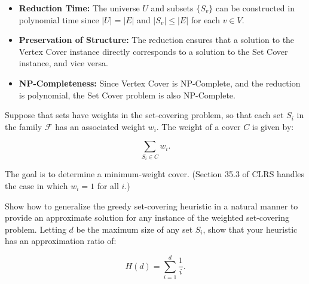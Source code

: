 \documentclass[10pt,letter,notitlepage]{article}
\newcounter{exercise}
\begin{document}
\begin{Answer}
\begin{itemize}
    \item \textbf{Reduction Time:} The universe \(U\) and subsets \(\{S_v\}\) can be constructed in polynomial time since \(|U| = |E|\) and \(|S_v| \leq |E|\) for each \(v \in V\).
    \item \textbf{Preservation of Structure:} The reduction ensures that a solution to the Vertex Cover instance directly corresponds to a solution to the Set Cover instance, and vice versa.
    \item \textbf{NP-Completeness:} Since Vertex Cover is NP-Complete, and the reduction is polynomial, the Set Cover problem is also NP-Complete.
\end{itemize}


\end{Answer}


\begin{exercise}[(20 marks)]

Suppose that sets have weights in the set-covering problem, so that each set \(S_i\) in the family \(\mathcal{F}\) has an associated weight \(w_i\). The weight of a cover \(C\) is given by:

\[
\sum_{S_i \in C} w_i.
\]

The goal is to determine a minimum-weight cover. (Section 35.3 of CLRS handles the case in which \(w_i = 1\) for all \(i\).)

Show how to generalize the greedy set-covering heuristic in a natural manner to provide an approximate solution for any instance of the weighted set-covering problem. Letting \(d\) be the maximum size of any set \(S_i\), show that your heuristic has an approximation ratio of:

\[
H(d) = \sum_{i=1}^d \frac{1}{i}.
\]

\end{exercise}
\end{document}
